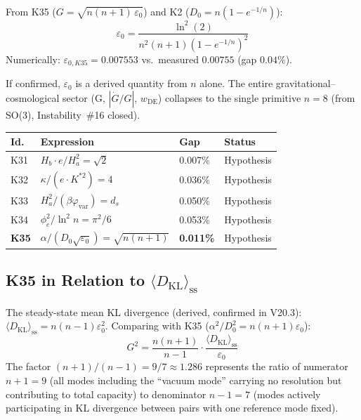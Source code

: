 \documentclass[12pt, a4paper]{article}
\begin{document}
\begin{derivedbox}[title={Corollary: $\varepsilon_0$ from $n$ Alone (gap 0.04\%)}]
From K35 ($G = \sqrt{n(n+1)\,\varepsilon_0}$) and K2 ($D_0 = n(1-e^{-1/n})$):
\[
  \varepsilon_0 = \frac{\ln^2(2)}{n^2(n+1)(1-e^{-1/n})^2}
\]
Numerically: $\varepsilon_{0,K35} = 0.007553$ vs.\ measured $0.00755$ (gap $0.04\%$).

If confirmed, $\varepsilon_0$ is a derived quantity from $n$ alone. The entire
gravitational--cosmological sector (G, $|\dot{G}/G|$, $w_{\mathrm{DE}}$) collapses
to the single primitive $n = 8$ (from SO(3), Instability~\#16 closed).
\end{derivedbox}

\begin{center}
\renewcommand{\arraystretch}{1.3}
\begin{tabular}{p{1cm} p{4.5cm} p{1.5cm} p{2cm}}
\toprule
\textbf{Id.} & \textbf{Expression} & \textbf{Gap} & \textbf{Status} \\
\midrule
K31 & $H_b\cdot e/H_a^2 = \sqrt{2}$ & 0.007\% & Hypothesis \\
K32 & $\kappa/(e\cdot K^{*2}) = 4$ & 0.036\% & Hypothesis \\
K33 & $H_a^2/(\beta\varphi_{\mathrm{var}}) = d_s$ & 0.050\% & Hypothesis \\
K34 & $\phi^2_e/\ln^2 n = \pi^2/6$ & 0.053\% & Hypothesis \\
\textbf{K35} & $\alpha/(D_0\sqrt{\varepsilon_0}) = \sqrt{n(n+1)}$ & \textbf{0.011\%} & Hypothesis \\
\bottomrule
\end{tabular}
\end{center}

\subsection{K35 in Relation to $\langle D_{\mathrm{KL}}\rangle_{\mathrm{ss}}$}

The steady-state mean KL divergence (derived, confirmed in V20.3):
$\langle D_{\mathrm{KL}}\rangle_{\mathrm{ss}} = n(n-1)\varepsilon_0^2$.
Comparing with K35 ($\alpha^2/D_0^2 = n(n+1)\varepsilon_0$):
\[
  G^2 = \frac{n(n+1)}{n-1}\cdot\frac{\langle D_{\mathrm{KL}}\rangle_{\mathrm{ss}}}{\varepsilon_0}
\]
The factor $(n+1)/(n-1) = 9/7\approx 1.286$ represents the ratio of numerator
$n+1=9$ (all modes including the ``vacuum mode'' carrying no resolution but contributing
to total capacity) to denominator $n-1=7$ (modes actively participating in KL divergence
between pairs with one reference mode fixed).
\end{document}

